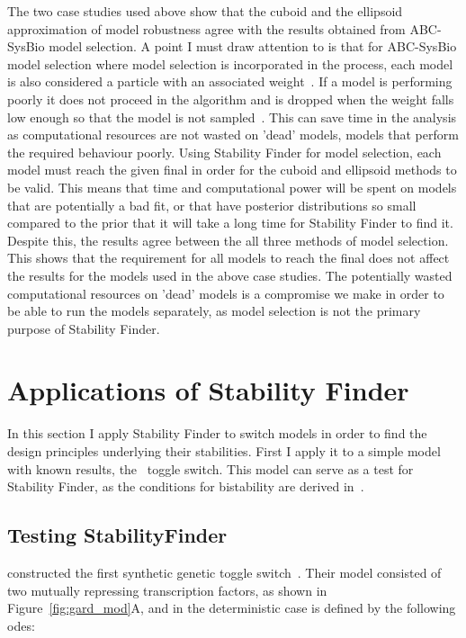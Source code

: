 \clearpage


The two case studies used above show that the cuboid and the ellipsoid approximation of model robustness agree with the results obtained from ABC-SysBio model selection. A point I must draw attention to is that for ABC-SysBio model selection where model selection is incorporated in the process, each model is also considered a particle with an associated weight~\autocite{Toni:2009tr}. If a model is performing poorly it does not proceed in the algorithm and is dropped when the weight falls low enough so that the model is not sampled~\autocite{Toni:2009tr}. This can save time in the analysis as computational resources are not wasted on 'dead' models, models that perform the required behaviour poorly. Using Stability Finder for model selection, each model must reach the given final \textepsilon{} in order for the cuboid and ellipsoid methods to be valid. This means that time and computational power will be spent on models that are potentially a bad fit, or that have posterior distributions so small compared to the prior that it will take a long time for Stability Finder to find it. Despite this, the results agree between the all three methods of model selection. This shows that the requirement for all models to reach the final \textepsilon{} does not affect the results for the models used in the above case studies. The potentially wasted computational resources on 'dead' models is a compromise we make in order to be able to run the models separately, as model selection is not the primary purpose of Stability Finder. 

\section{Applications of Stability Finder}

In this section I apply Stability Finder to switch models in order to find the design principles underlying their stabilities. First I apply it to a simple model with known results, the~\textcite{Gardner:2000vha} toggle switch. This model can serve as a test for Stability Finder, as the conditions for bistability are derived in~\textcite{Gardner:2000vha}.


\subsection{Testing StabilityFinder}
\label{sec:gard}
\textcite{Gardner:2000vha} constructed the first synthetic genetic toggle switch~\autocite{Gardner:2000vha}. Their model consisted of two mutually repressing transcription factors, as shown in Figure~\ref{fig:gard_mod}A, and in the deterministic case is defined by the following \acrshort{ode}s:

